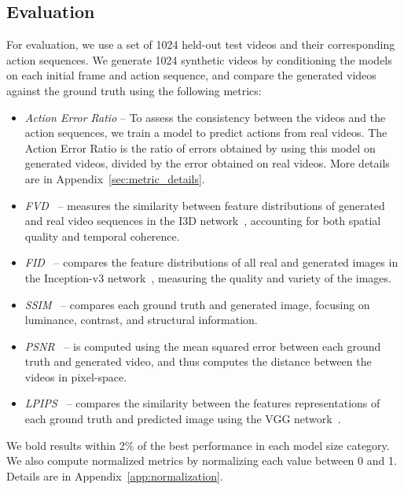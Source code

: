 \subsection{Evaluation}
For evaluation, we use a set of 1024 held-out test videos and their corresponding action sequences. We generate 1024 synthetic videos by conditioning the models on each initial frame and action sequence, and compare the generated videos against the ground truth using the following metrics: 
\begin{itemize}[leftmargin=*, topsep=0pt]
    \setlength\itemsep{0.3mm}
    \item \textit{Action Error Ratio} -- To assess the consistency between the videos and the action sequences, we train a model to predict actions from real videos. The Action Error Ratio is the ratio of errors obtained by using this model on generated videos, divided by the error obtained on real videos. More details are in Appendix~\ref{sec:metric_details}.
    \item \textit{FVD}~\citep{unterthiner2019fvd} -- measures the similarity between feature distributions of generated and real video sequences in the I3D network~\citep{carreira2017quo}, accounting for both spatial quality and temporal coherence. 
   \item \textit{FID}~\citep{heusel2017gans} -- compares the feature distributions of all real and generated images in the Inception-v3 network~\citep{szegedy2015going}, measuring the quality and variety of the images. 
    \item \textit{SSIM}~\citep{wang2004image} -- compares each ground truth and generated image, focusing on luminance, contrast, and structural information. 
    \item \textit{PSNR}~\citep{hore2010image} -- is computed using the mean squared error between each ground truth and generated video, and thus computes the distance between the videos in pixel-space.
    \item \textit{LPIPS}~\citep{zhang2018unreasonable} -- compares the similarity between the features representations of each ground truth and predicted image using the VGG network~\citep{simonyan2014very}. 
\end{itemize}
We bold results within 2\% of the best performance in each model size category. We also compute normalized metrics by normalizing each value between 0 and 1. Details are in Appendix~\ref{app:normalization}.
%



